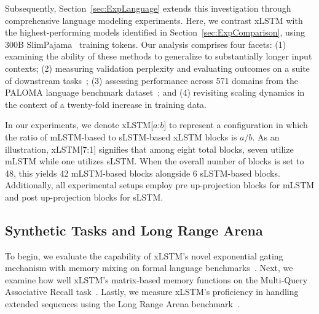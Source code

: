 Subsequently, Section~\ref{sec:ExpLanguage} extends this investigation through comprehensive language modeling experiments. Here, we contrast xLSTM with the highest-performing models identified in Section~\ref{sec:ExpComparison}, using 300B SlimPajama~\citep{Soboleva:23} training tokens. Our analysis comprises four facets: (1) examining the ability of these methods to generalize to substantially longer input contexts; (2) measuring validation perplexity and evaluating outcomes on a suite of downstream tasks~\citep{Sutawika:24}; (3) assessing performance across 571 domains from the PALOMA language benchmark dataset~\citep{Magnusson:23arxivshort}; and (4) revisiting scaling dynamics in the context of a twenty-fold increase in training data.

\label{sec:xlstm_blocks_notation}
In our experiments, we denote xLSTM[$a$:$b$] to represent a configuration in which the ratio of mLSTM-based to sLSTM-based xLSTM blocks is $a/b$. As an illustration, xLSTM[7:1] signifies that among eight total blocks, seven utilize mLSTM while one utilizes sLSTM. When the overall number of blocks is set to 48, this yields 42 mLSTM-based blocks alongside 6 sLSTM-based blocks. Additionally, all experimental setups employ pre up-projection blocks for mLSTM and post up-projection blocks for sLSTM.

\subsection{Synthetic Tasks and Long Range Arena}
\label{sec:ExpSyntethic}
To begin, we evaluate the capability of xLSTM’s novel exponential gating mechanism with memory mixing on formal language benchmarks~\citep{Deletang:23}. Next, we examine how well xLSTM's matrix-based memory functions on the Multi-Query Associative Recall task~\citep{Arora:23arxiv}. Lastly, we measure xLSTM’s proficiency in handling extended sequences using the Long Range Arena benchmark~\citep{Tay:21}.

